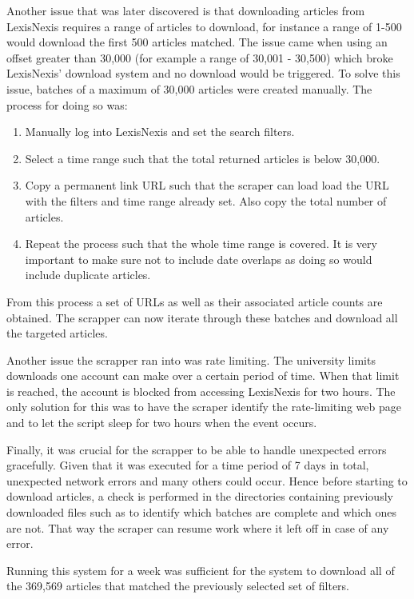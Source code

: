 Another issue that was later discovered is that downloading articles from LexisNexis requires a range of articles to download, for instance a range of 1-500 would download the first 500 articles matched. The issue came when using an offset greater than 30,000 (for example a range of 30,001 - 30,500) which broke LexisNexis' download system and no download would be triggered. To solve this issue, batches of a maximum of 30,000 articles were created manually. The process for doing so was:
\begin{enumerate}
    \item Manually log into LexisNexis and set the search filters.
    \item Select a time range such that the total returned articles is below 30,000.
    \item Copy a permanent link URL such that the scraper can load load the URL with the filters and time range already set. Also copy the total number of articles.
    \item Repeat the process such that the whole time range is covered. It is very important to make sure not to include date overlaps as doing so would include duplicate articles.
\end{enumerate}

From this process a set of URLs as well as their associated article counts are obtained. The scrapper can now iterate through these batches and download all the targeted articles.

Another issue the scrapper ran into was rate limiting. The university limits downloads one account can make over a certain period of time. When that limit is reached, the account is blocked from accessing LexisNexis for two hours. The only solution for this was to have the scraper identify the rate-limiting web page and to let the script sleep for two hours when the event occurs.

Finally, it was crucial for the scrapper to be able to handle unexpected errors gracefully. Given that it was executed for a time period of 7 days in total, unexpected network errors and many others could occur. Hence before starting to download articles, a check is performed in the directories containing previously downloaded files such as to identify which batches are complete and which ones are not. That way the scraper can resume work where it left off in case of any error.

Running this system for a week was sufficient for the system to download all of the 369,569 articles that matched the previously selected set of filters.

